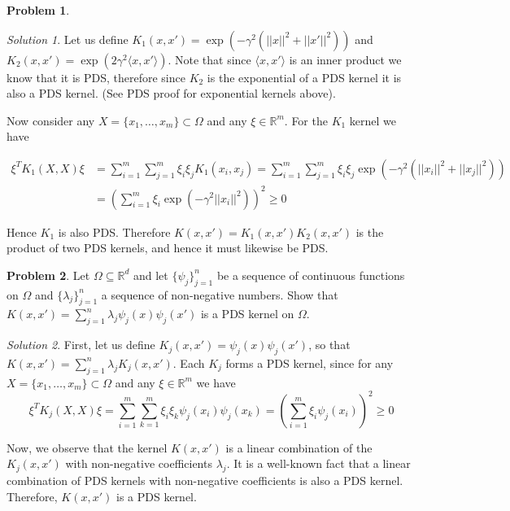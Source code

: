 \documentclass[12pt,a4paper]{article}
\theoremstyle{definition}
\newtheorem{problem}{Problem}
\theoremstyle{remark}
\newtheorem*{solution}{Solution}
\begin{document}
\begin{problem}
\begin{itemize}
\begin{solution}
            Let us define $K_1(x,x') = \exp\left(-\gamma^2(||x||^2 + ||x'||^2)\right)$ and $K_2(x,x') = \exp \left( 2 \gamma^2 \langle x, x' \rangle \right)$. Note that since $\langle x, x' \rangle$ is an inner product we know that it is PDS, therefore since $K_2$ is the exponential of a PDS kernel it is also a PDS kernel. (See PDS proof for exponential kernels above). 

            Now consider any $X = \{x_1, \dots, x_m \} \subset \Omega$ and any $\xi \in \mathbb R^m$. For the $K_1$ kernel we have
            
            \begin{align*}
                \xi^T K_1(X,X) \xi &= \sum_{i=1}^m \sum_{j=1}^m \xi_i \xi_j K_1(x_i, x_j) = \sum_{i=1}^m \sum_{j=1}^m \xi_i \xi_j \exp\left(-\gamma^2(||x_i||^2 + ||x_j||^2)\right) \\
                &= \left( \sum_{i=1}^m \xi_i \exp\left(-\gamma^2||x_i||^2 \right) \right)^2 \ge 0
            \end{align*}

            Hence $K_1$ is also PDS. Therefore $K(x,x') = K_1(x,x')K_2(x,x')$ is the product of two PDS kernels, and hence it must likewise be PDS.  
        \end{solution}
    \end{itemize}
\end{problem}

\begin{problem}
    Let $\Omega \subseteq \mathbb R^d$ and let $\{\psi_j\}_{j=1}^n$ be a sequence of continuous functions on $\Omega$ and $\{\lambda_j\}_{j=1}^n$ a sequence of non-negative numbers. Show that $K(x,x')=\sum_{j=1}^n \lambda_j \psi_j(x) \psi_j(x')$ is a PDS kernel on $\Omega$. 
\end{problem}
\begin{solution}
    First, let us define $K_j(x,x') = \psi_j(x)\psi_j(x')$, so that $K(x,x') = \sum_{j=1}^n \lambda_j K_j(x,x')$. Each $K_j$ forms a PDS kernel, since for any $X=\{x_1,\dots, x_m\} \subset \Omega$ and any $\xi \in \mathbb R^m$ we have $$\xi^T K_j(X,X)\xi =\sum_{i=1}^m \sum_{k=1}^m \xi_i \xi_k \psi_j(x_i)\psi_j(x_k) = \left(\sum_{i=1}^m \xi_i \psi_j(x_i) \right)^2 \ge 0$$ 

    Now, we observe that the kernel $K(x, x')$ is a linear combination of the $K_j(x, x')$ with non-negative coefficients $\lambda_j$. It is a well-known fact that a linear combination of PDS kernels with non-negative coefficients is also a PDS kernel. Therefore, $K(x, x')$ is a PDS kernel.
\end{solution}
\end{document}
